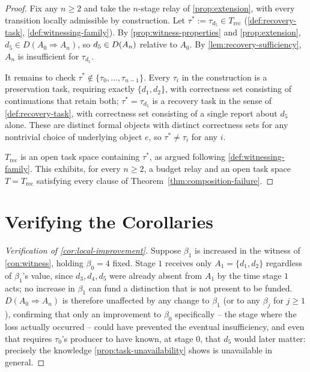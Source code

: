 \begin{proof}
Fix any $n \ge 2$ and take the $n$-stage relay of
\cref{prop:extension}, with every transition locally admissible by
construction. Let $\tau^* := \tau_{d_5} \in T_{\mathrm{rec}}$
(\cref{def:recovery-task}, \cref{def:witnessing-family}). By
\cref{prop:witness-properties} and \cref{prop:extension}, $d_5 \in
D(A_0 \Rightarrow A_n)$, so $d_5 \in D(A_n)$ relative to $A_0$. By
\cref{lem:recovery-sufficiency}, $A_n$ is insufficient for $\tau_{d_5}$.

It remains to check $\tau^* \notin \{\tau_0, \ldots, \tau_{n-1}\}$. Every
$\tau_i$ in the construction is a preservation task, requiring exactly
$\{d_1,d_2\}$, with correctness set consisting of continuations that
retain both; $\tau^* = \tau_{d_5}$ is a recovery task in the sense of
\cref{def:recovery-task}, with correctness set consisting of a single
report about $d_5$ alone. These are distinct formal objects with distinct
correctness sets for any nontrivial choice of underlying object $e$, so
$\tau^* \neq \tau_i$ for any $i$.

$T_{\mathrm{rec}}$ is an open task space containing $\tau^*$, as argued
following \cref{def:witnessing-family}. This exhibits, for every $n \ge
2$, a budget relay and an open task space $T = T_{\mathrm{rec}}$ satisfying
every clause of Theorem~\ref{thm:composition-failure}.
\end{proof}

\section{Verifying the Corollaries}

\begin{proof}[Verification of \cref{cor:local-improvement}]
Suppose $\beta_1$ is increased in the witness of \cref{con:witness},
holding $\beta_0 = 4$ fixed. Stage $1$ receives only $A_1 = \{d_1,d_2\}$
regardless of $\beta_1$'s value, since $d_3, d_4, d_5$ were already
absent from $A_1$ by the time stage $1$ acts; no increase in $\beta_1$
can fund a distinction that is not present to be funded. $D(A_0
\Rightarrow A_n)$ is therefore unaffected by any change to $\beta_1$ (or
to any $\beta_j$ for $j \ge 1$), confirming that only an improvement to
$\beta_0$ specifically -- the stage where the loss actually occurred --
could have prevented the eventual insufficiency, and even that requires
$\tau_0$'s producer to have known, at stage $0$, that $d_5$ would later
matter: precisely the knowledge \cref{prop:task-unavailability} shows is
unavailable in general.
\end{proof}

